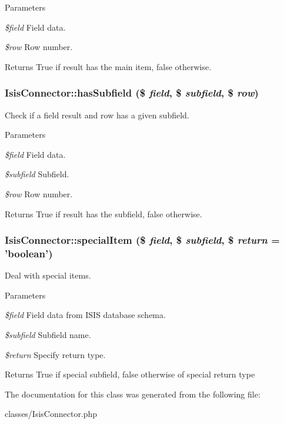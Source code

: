 \begin{DoxyParams}{Parameters}
\item[{\em \$field}]Field data.\item[{\em \$row}]Row number.\end{DoxyParams}
\begin{DoxyReturn}{Returns}
True if result has the main item, false otherwise. 
\end{DoxyReturn}
\hypertarget{classIsisConnector_a2e6970a3aca76a1dbb5b4bb5ac3adda1}{
\subsubsection[{hasSubfield}]{\setlength{\rightskip}{0pt plus 5cm}IsisConnector::hasSubfield (\$ {\em field}, \/  \$ {\em subfield}, \/  \$ {\em row})}}
\label{classIsisConnector_a2e6970a3aca76a1dbb5b4bb5ac3adda1}
Check if a field result and row has a given subfield.


\begin{DoxyParams}{Parameters}
\item[{\em \$field}]Field data.\item[{\em \$subfield}]Subfield.\item[{\em \$row}]Row number.\end{DoxyParams}
\begin{DoxyReturn}{Returns}
True if result has the subfield, false otherwise. 
\end{DoxyReturn}
\hypertarget{classIsisConnector_a9050227e8d8f10821a4df08a5705832a}{
\subsubsection[{specialItem}]{\setlength{\rightskip}{0pt plus 5cm}IsisConnector::specialItem (\$ {\em field}, \/  \$ {\em subfield}, \/  \$ {\em return} = {\ttfamily 'boolean'})}}
\label{classIsisConnector_a9050227e8d8f10821a4df08a5705832a}
Deal with special items.


\begin{DoxyParams}{Parameters}
\item[{\em \$field}]Field data from ISIS database schema.\item[{\em \$subfield}]Subfield name.\item[{\em \$return}]Specify return type.\end{DoxyParams}
\begin{DoxyReturn}{Returns}
True if special subfield, false otherwise of special return type 
\end{DoxyReturn}


The documentation for this class was generated from the following file:\begin{DoxyCompactItemize}
\item 
classes/IsisConnector.php\end{DoxyCompactItemize}
